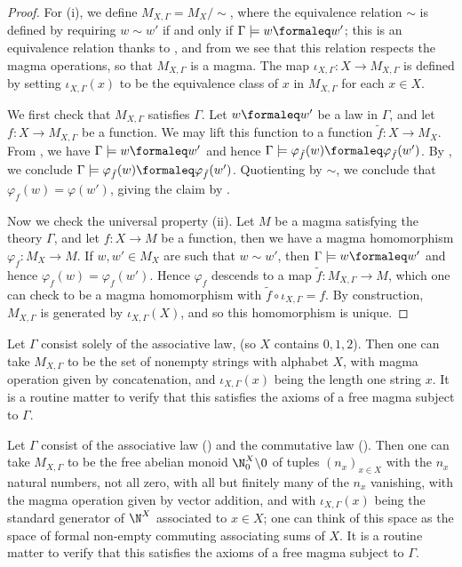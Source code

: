 \begin{proof}\leanok
  For (i), we define $M_{X,\Gamma} = M_X / \sim$, where the equivalence relation $\sim$ is defined by requiring $w \sim w'$ if and only if $\Gamma \models w \formaleq w'$; this is an equivalence relation thanks to , and from  we see that this relation respects the magma operations, so that $M_{X,\Gamma}$ is a magma. The map $\iota_{X,\Gamma}: X \to M_{X,\Gamma}$ is defined by setting $\iota_{X,\Gamma}(x)$ to be the equivalence class of $x$ in $M_{X,\Gamma}$ for each $x \in X$.

  We first check that $M_{X,\Gamma}$ satisfies $\Gamma$. Let $w \formaleq w'$ be a law in $\Gamma$, and let $f: X \to M_{X,\Gamma}$ be a function. We may lift this function to a function $\tilde{f}: X \to M_X$. From , we have $\Gamma \models w \formaleq w'$ and hence $\Gamma \models \varphi_{\tilde{f}}(w) \formaleq \varphi_{\tilde{f}}(w')$. By , we conclude $\Gamma \models \varphi_{\tilde{f}}(w) \formaleq \varphi_{\tilde{f}}(w')$. Quotienting by $\sim$, we conclude that $\varphi_f(w) = \varphi(w')$, giving the claim by .

  Now we check the universal property (ii). Let $M$ be a magma satisfying the theory $\Gamma$, and let $f: X \to M$ be a function, then we have a magma homomorphism $\varphi_f: M_X \to M$. If $w, w' \in M_X$ are such that $w \sim w'$, then $\Gamma \models w \formaleq w'$ and hence $\varphi_f(w) = \varphi_f(w')$. Hence $\varphi_f$ descends to a map $\tilde{f}: M_{X,\Gamma} \to M$, which one can check to be a magma homomorphism with $\tilde{f} \circ \iota_{X,\Gamma} = f$. By construction, $M_{X,\Gamma}$ is generated by $\iota_{X,\Gamma}(X)$, and so this homomorphism is unique.
\end{proof}

\begin{example}
  Let $\Gamma$ consist solely of the associative law,  (so $X$ contains $0,1,2$). Then one can take $M_{X,\Gamma}$ to be the set of nonempty strings with alphabet $X$, with magma operation given by concatenation, and $\iota_{X,\Gamma}(x)$ being the length one string $x$. It is a routine matter to verify that this satisfies the axioms of a free magma subject to $\Gamma$.
\end{example}

\begin{example}\label{facm}
  Let $\Gamma$ consist of the associative law () and the commutative law (). Then one can take $M_{X,\Gamma}$ to be the free abelian monoid $\N_0^X \backslash 0$ of tuples $(n_x)_{x \in X}$ with the $n_x$ natural numbers, not all zero, with all but finitely many of the $n_x$ vanishing, with the magma operation given by vector addition, and with $\iota_{X,\Gamma}(x)$ being the standard generator of $\N^X$ associated to $x \in X$; one can think of this space as the space of formal non-empty commuting associating sums of $X$. It is a routine matter to verify that this satisfies the axioms of a free magma subject to $\Gamma$.
\end{example}

